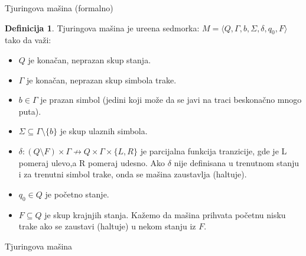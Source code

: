 \documentclass[aspectratio=169, xcolor=table, 10pt]{beamer}
\theoremstyle{definition}
\newtheorem{defi}{Definicija}[section]
\begin{document}
\begin{frame}{Tjuringova ma\v sina (formalno)}

\begin{defi}
    Tjuringova ma\v sina je ure\dj ena sedmorka: $M = \langle Q, \Gamma, b, \Sigma, \delta, q_0, F \rangle$ tako da va\v zi:
    \begin{itemize}
        \item $Q$ je konačan, neprazan skup stanja.
        \item $\Gamma$ je konačan, neprazan skup simbola trake.
        \item $b\in \Gamma$ je prazan simbol (jedini koji mo\v ze da se javi na traci beskonačno mnogo puta).
        \item $\Sigma \subseteq \Gamma \setminus \{b\}$ je skup ulaznih simbola.
        \item $\delta :(Q\setminus F)\times \Gamma \not\rightarrow Q\times \Gamma \times \{L,R\}$ je parcijalna funkcija tranzicije, gde je L pomeraj ulevo,a R pomeraj udesno. Ako $\delta$ nije definisana u trenutnom stanju i za trenutni simbol trake, onda se ma\v sina zaustavlja (haltuje).
        \item $ q_{0}\in Q$ je početno stanje.
        \item $F\subseteq Q$ je skup krajnjih stanja. Ka\v zemo da ma\v sina prihvata po\v cetnu nisku trake ako se zaustavi (haltuje) u nekom stanju iz $F$.
    \end{itemize}
    
\end{defi}
    
\end{frame}

\begin{frame}{Tjuringova ma\v sina}

\begin{figure}[ht]
    \centering
    \hfill
    
\end{figure}
    
\end{frame}
\end{document}
